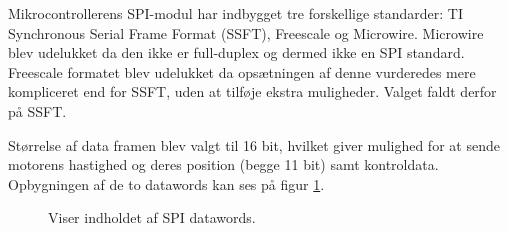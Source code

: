 Mikrocontrollerens SPI-modul har indbygget tre forskellige standarder: TI Synchronous Serial Frame Format (SSFT), Freescale og Microwire. 
Microwire blev udelukket da den ikke er full-duplex og dermed ikke en SPI standard. 
Freescale formatet blev udelukket da opsætningen af denne vurderedes mere kompliceret end for SSFT,
uden at tilføje ekstra muligheder.
Valget faldt derfor på SSFT.

Størrelse af data framen blev valgt til 16 bit, hvilket giver mulighed for at sende
motorens hastighed og deres position (begge 11 bit) samt kontroldata.
Opbygningen af de to datawords kan ses på figur \ref{fig:protokol1}.

\begin{figure}[h!]
\centering
{}
\qquad
{}
\caption[Indholdet af SPI datawords]{Viser indholdet af SPI datawords. }
\label{fig:protokol1}
\end{figure}

